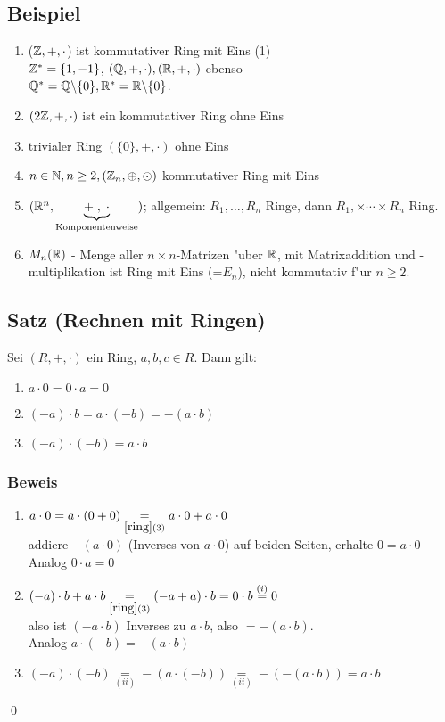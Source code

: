 \subsection{Beispiel}
\begin{enumerate}
	\item
	($\mathbb{Z}, +, \cdot$) ist kommutativer Ring mit Eins (1)\\
	$\mathbb{Z}^* = \{1,-1\}$,
	$(\mathbb{Q}, +, \cdot), (\mathbb{R}, +, \cdot)$ ebenso\\
	$\mathbb{Q}^*=\mathbb{Q} \backslash \{0\}, \mathbb{R}^* = \mathbb{R} \backslash \{0\}$.
	\item
	$(2\mathbb{Z}, +, \cdot)$ ist ein kommutativer Ring ohne Eins
	\item
	trivialer Ring $(\{0\},+, \cdot)$ ohne Eins
	\item
	$n \in \mathbb{N}, n \geq 2,  (\mathbb{Z}_n, \oplus, \odot)$ kommutativer Ring mit Eins
	\item
	$(\mathbb{R}^n, \underbrace{+\; ,\; \cdot}_{\text{Komponentenweise}})$; allgemein: $R_1, \dots , R_n$ Ringe, dann $R_1, \times \cdots \times R_n$ Ring.
	\item
	$M_n (\mathbb{R})$ - Menge aller $n \times n$-Matrizen  "uber $\mathbb{R}$, mit Matrixaddition und -multiplikation ist Ring mit Eins (=$E_n$), nicht kommutativ f"ur $ n \geq 2$.
\end{enumerate}
\subsection[Satz: Rechnen mit Ringen]{Satz (Rechnen mit Ringen)} \label{rechnenmitringen}
Sei $(R, +, \cdot)$ ein Ring, $a,b,c \in R$. Dann gilt:
{\renewcommand{\labelenumi}{(\roman{enumi})}\begin{enumerate}
	\item
	$a \cdot 0 = 0 \cdot a = 0$
	\item 
	$(-a)\cdot b = a \cdot (-b) = -(a \cdot b)$
	\item
	$(-a) \cdot (-b) = a \cdot b$
\end{enumerate}

\subsubsection*{Beweis}

\begin{enumerate}
	\item
	$a \cdot 0 = a \cdot (0+0) \underset{\ref{ring}(3)}{=}a \cdot 0 + a \cdot 0$\\
	addiere $-(a \cdot 0)$ (Inverses von $a \cdot 0$) auf beiden Seiten,  erhalte $0=a \cdot 0$\\
	Analog $0 \cdot a = 0$
	\item
	$(-a)\cdot b + a \cdot b \underset{\ref{ring}(3)}{=} (-a+a) \cdot b = 0 \cdot b \overset{(i)}{=}0$\\
	also ist $(-a \cdot b)$ Inverses zu $a \cdot b$, also $=-(a \cdot b)$.\\
	Analog $a \cdot (-b) = -(a \cdot b)$
	\item
	$(-a) \cdot (-b) \underset{(ii)}{=} -(a \cdot (-b)) \underset{(ii)}{=}-(-(a \cdot b)) = a \cdot b   $
\end{enumerate} } \qed

